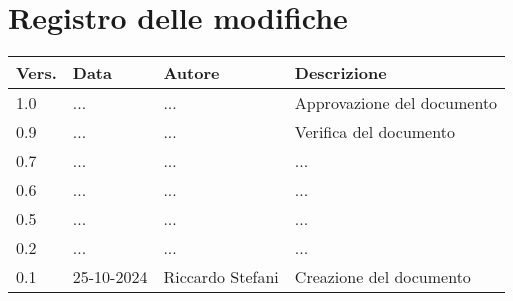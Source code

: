 \section*{Registro delle modifiche}

\begin{table}[h]
    \centering
    \begin{tabular}{|l|l|l|l|}
        \hline
        \rowcolor[gray]{0.9}
        \textbf{Vers.} & \textbf{Data} & \textbf{Autore} & \textbf{Descrizione}\\
        \hline
        1.0 & ... & ... & Approvazione del documento\\
        \hline
        0.9 & ... & ... & Verifica del documento\\
        \hline
        0.7 & ... & ... & ...\\
        \hline
        0.6 & ... & ... & ...\\
        \hline
        0.5 & ... & ... & ...\\
        \hline
        0.2 & ... & ... & ...\\
        \hline
        0.1 & 25-10-2024 & Riccardo Stefani & Creazione del documento\\
        \hline
    \end{tabular}
\end{table}
